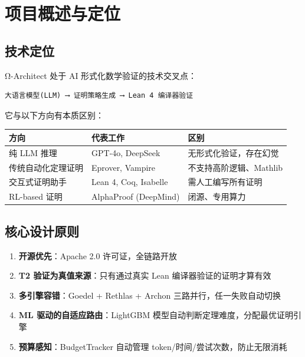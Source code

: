 \documentclass[
  11pt,
  a4paper,
]{ctexrep}
\newcounter{none} %
\providecommand{\tightlist}{%
  \setlength{\itemsep}{0pt}\setlength{\parskip}{0pt}}
\begin{document}
\newpage


\chapter{项目概述与定位}\label{ux9879ux76eeux6982ux8ff0ux4e0eux5b9aux4f4d}

\section{技术定位}\label{sec-positioning}

Ω-Architect 处于 AI 形式化数学验证的技术交叉点：

\begin{verbatim}
大语言模型(LLM) ⟶ 证明策略生成 ⟶ Lean 4 编译器验证
\end{verbatim}

它与以下方向有本质区别：

{\def\LTcaptype{none} %
\begin{longtable}[]{@{}lll@{}}
\toprule\noalign{}
方向 & 代表工作 & 区别 \\
\midrule\noalign{}
\endhead
\bottomrule\noalign{}
\endlastfoot
纯 LLM 推理 & GPT-4o, DeepSeek & 无形式化验证，存在幻觉 \\
传统自动化定理证明 & Eprover, Vampire & 不支持高阶逻辑、Mathlib \\
交互式证明助手 & Lean 4, Coq, Isabelle & 需人工编写所有证明 \\
RL-based 证明 & AlphaProof (DeepMind) & 闭源、专用算力 \\
\end{longtable}
}

\section{核心设计原则}\label{sec-design-principles}

\begin{enumerate}
\def\labelenumi{\arabic{enumi}.}
\tightlist
\item
  \textbf{开源优先}：Apache 2.0 许可证，全链路开放
\item
  \textbf{T2 验证为真值来源}：只有通过真实 Lean 编译器验证的证明才算有效
\item
  \textbf{多引擎容错}：Goedel + Rethlas + Archon
  三路并行，任一失败自动切换
\item
  \textbf{ML 驱动的自适应路由}：LightGBM
  模型自动判断定理难度，分配最优证明引擎
\item
  \textbf{预算感知}：BudgetTracker 自动管理
  token/时间/尝试次数，防止无限消耗
\end{enumerate}
\end{document}
